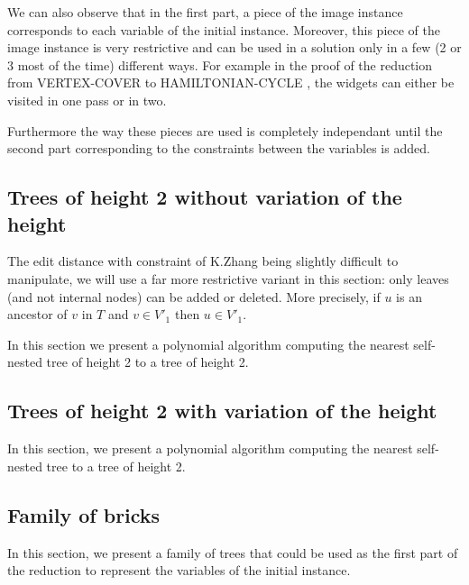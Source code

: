 We can also observe that in the first part, a piece of the image
instance corresponds to each variable of the initial
instance. Moreover, this piece of the image instance is very
restrictive and can be used in a solution only in a few (2 or 3 most
of the time) different ways. For example in the proof of the reduction
from VERTEX-COVER to HAMILTONIAN-CYCLE \cite{polytech}, the widgets
can either be visited in one pass or in two.

Furthermore the way these pieces are used is completely independant
until the second part corresponding to the constraints between the
variables is added.

\subsection{Trees of height 2 without variation of the height}
The edit distance with constraint of K.Zhang being slightly difficult
to manipulate, we will use a far more restrictive variant in this
section: only leaves (and not internal nodes) can be added or
deleted. More precisely, if $u$ is an ancestor of $v$ in $T$ and
$v \in V'_{1}$ then $u \in V'_{1}$.

In this section we present a polynomial algorithm computing the
nearest self-nested tree of height 2 to a tree of height 2.

\subsection{Trees of height 2 with variation of the height}
In this section, we present a polynomial algorithm computing the nearest
self-nested tree to a tree of height 2.

\subsection{Family of bricks}
In this section, we present a family of trees that could be used as
the first part of the reduction to represent the variables of the
initial instance.